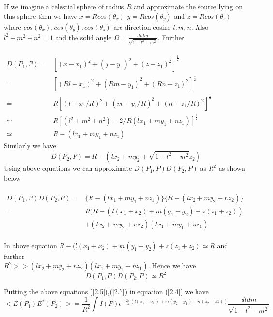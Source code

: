 If we imagine a celestial sphere of radius $R$ and approximate the source lying on this sphere then we have $x=R cos(\theta_x)$
$y=R cos(\theta_y)$ and $z=R cos(\theta_z)$ where $cos(\theta_x),cos(\theta_y),cos(\theta_z)$ are direction cosine $l,m,n$.
Also $l^2+m^2+n^2=1$ and the solid angle $\Omega = \frac{dldm}{\sqrt{1-l^2-m^2}}$. Further \\\\
$
\begin{array}{rl}
  D(P_1,P) = &  [ (x-x_1)^2 + (y-y_1)^2 + (z-z_1)^2]^{\frac{1}{2}}\\
           = &  [ (Rl-x_1)^2 + (Rm-y_1)^2 + (Rn-z_1)^2 ]^{\frac{1}{2}}\\
	   = &  R[(l-x_1/R)^2 + (m-y_1/R)^2 + (n-z_1/R)^2 ]^{\frac{1}{2}}\\
	   \simeq & R [(l^2+m^2+n^2)-2/R(lx_1+my_1+nz_1)]^{\frac{1}{2}}\\
	   \simeq & R-(lx_1+my_1+nz_1)
\label{hello}
\end{array}
$\\
Similarly we have 
\begin{equation}
 D(P_2,P) = R-(lx_2+my_2+\sqrt{1-l^2-m^2}z_2)
\label{2.6}
\end{equation}
Using above equations we can approximate $D(P_1,P) D(P_2,P)$ as $R^2$ as shown below\\\\
$
\begin{array}{rl}
  D(P_1,P)D(P_2,P) =& \{R-(lx_1+my_1+nz_1)\}\{R-(lx_2+my_2+nz_2)\}\\
		   =& R(R-(l(x_1+x_2)+m(y_1+y_2)+z(z_1+z_2)) \\&+ (lx_2+my_2+nz_2)(lx_1+my_1+nz_1)
\end{array}
$\\\\
In above equation $R-(l(x_1+x_2)+m(y_1+y_2)+z(z_1+z_2) \simeq R$ and further \\$R^2>>(lx_2+my_2+nz_2)(lx_1+my_1+nz_1)$.
Hence we have 
\begin{equation}
 D(P_1,P)D(P_2,P) \simeq R^2
\label{2.7}
\end{equation}

Putting the above equations (\ref{2.5}),(\ref{2.7}) in equation (\ref{2.4}) we have
\begin{equation}
 < E(P_1)E^*(P_2)> = \frac{1}{R^2}\int I(P) e^{-\frac{2\pi}{\lambda}(l(x_2-x_1)+m(y_2-y_1)+n(z_2-z1))} \frac{dldm}{\sqrt{1-l^2-m^2}}
\label{2.8}
\end{equation}

